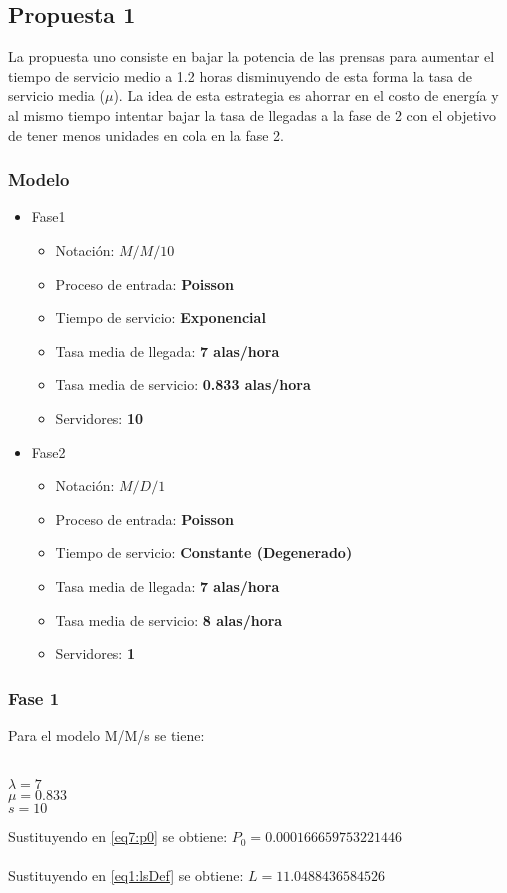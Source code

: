 \documentclass{article}
\begin{document}
\subsection{Propuesta 1}
La propuesta uno consiste en bajar la potencia de las prensas para aumentar el 
tiempo de servicio medio a 1.2 horas disminuyendo de esta forma la tasa 
de servicio media ($\mu$). La idea de esta estrategia es ahorrar 
en el costo de energía y al mismo tiempo intentar bajar la tasa de llegadas a la fase 
de 2 con el objetivo de tener menos unidades en cola en la fase 2.
\subsubsection{Modelo}
\begin{itemize}
	\item Fase1
		\begin{itemize}
			\item \large{Notación: } \textbf{$M/M/10$}
			\item \large{Proceso de entrada: } \textbf{Poisson}
			\item \large{Tiempo de servicio: } \textbf{Exponencial}
			\item \large{Tasa media de llegada: } \textbf{7 alas/hora}
			\item \large{Tasa media de servicio: } \textbf{0.833 alas/hora}
			\item \large{Servidores: } \textbf{10}
		\end{itemize}
	\item Fase2
		\begin{itemize}
			\item \large{Notación: } \textbf{$M/D/1$}
			\item \large{Proceso de entrada: } \textbf{Poisson}
			\item \large{Tiempo de servicio: } \textbf{Constante (Degenerado)}
			\item \large{Tasa media de llegada: } \textbf{7 alas/hora}
			\item \large{Tasa media de servicio: } \textbf{8 alas/hora}
			\item \large{Servidores: } \textbf{1}
		\end{itemize}
\end{itemize}

\subsubsection{Fase 1}
Para el modelo M/M/s se tiene: \\\\
\begin{large}
$\lambda = 7$\\
$\mu = 0.833$\\
$ s = 10$\\
\end{large}
Sustituyendo en \ref{eq7:p0} se obtiene: $P_{0}= 0.000166659753221446$ \\\\
Sustituyendo en \ref{eq1:lsDef} se obtiene: $L = 11.0488436584526$
\end{document}
